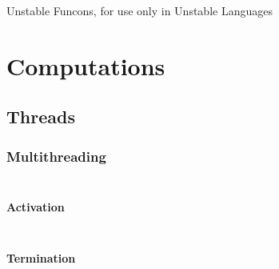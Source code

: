 Unstable Funcons, for use only in Unstable Languages

\section*{Computations}\hypertarget{computations}{}\label{computations}

\subsection*{Threads}\hypertarget{threads}{}\label{threads}

\subsubsection*{Multithreading}\hypertarget{multithreading}{}\label{multithreading}

\begin{align*}
  [ ~ 
  \KEY{Datatype} ~ & \NAMEHYPER{../../../../../Unstable-Funcons-beta/Computations/Threads}{Multithreading}{thread-ids} \\
  \KEY{Funcon} ~ & \NAMEHYPER{../../../../../Unstable-Funcons-beta/Computations/Threads}{Multithreading}{thread-joinable}
  ~ ]
\end{align*}
\paragraph*{Activation}\hypertarget{activation}{}\label{activation}

\begin{align*}
  [ ~ 
  \KEY{Funcon} ~ & \NAMEHYPER{../../../../../Unstable-Funcons-beta/Computations/Threads}{Multithreading}{multithread} \\
  \KEY{Funcon} ~ & \NAMEHYPER{../../../../../Unstable-Funcons-beta/Computations/Threads}{Multithreading}{thread-activate}
  ~ ]
\end{align*}
\paragraph*{Termination}\hypertarget{termination}{}\label{termination}

\begin{align*}
  [ ~ 
  \KEY{Funcon} ~ & \NAMEHYPER{../../../../../Unstable-Funcons-beta/Computations/Threads}{Multithreading}{thread-join}
  ~ ]
\end{align*}
